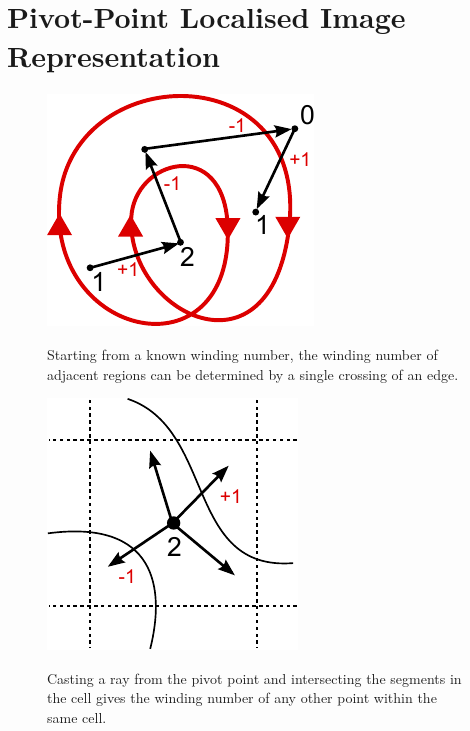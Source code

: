 \documentclass[11pt,a4paper,twoside]{article}
\begin{document}
\section {Pivot-Point Localised Image Representation}

\begin {figure} [ht]
\centering
\begin {minipage} [b] {0.45\linewidth}
	\centering
	\includegraphics [width=0.6\columnwidth]{figures/ray_our}
	\caption {Starting from a known winding number, the winding number of adjacent regions can be determined by a single crossing of an edge.}
	\label {fig:ray_our}
\end {minipage}
\hspace{0.5cm}
\begin{minipage} [b] {0.45\linewidth}
	\centering
	\includegraphics [width=0.6\columnwidth]{figures/cell}
	\caption {Casting a ray from the pivot point and intersecting the segments in the cell gives the winding number of any other point within the same cell.}
	\label {fig:cell}	
\end {minipage}
\end {figure}
\end{document}
